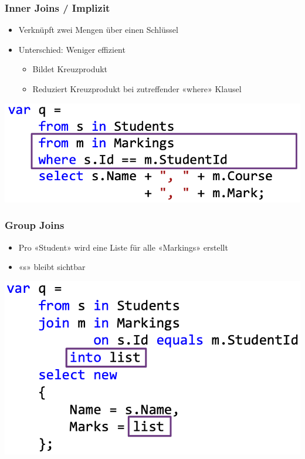 \subsubsection{Inner Joins / Implizit}
\begin{itemize}
    \item Verknüpft zwei Mengen über einen Schlüssel
    \item Unterschied: Weniger effizient
    \begin{itemize}
        \item Bildet Kreuzprodukt
        \item Reduziert Kreuzprodukt bei zutreffender «where» Klausel
    \end{itemize}
\end{itemize}
\vspace{-8pt}
\begin{center}
    \includegraphics[scale=.3]{graphic/linq/inner join implizit.png}
\end{center}
\vspace{-8pt}

\subsubsection{Group Joins}
\begin{itemize}
    \item Pro «Student» wird eine Liste für alle «Markings» erstellt
    \item «s» bleibt sichtbar
\end{itemize}
\vspace{-8pt}
\begin{center}
    \includegraphics[scale=.3]{graphic/linq/Group Joins.png}
\end{center}
\vspace{-8pt}

